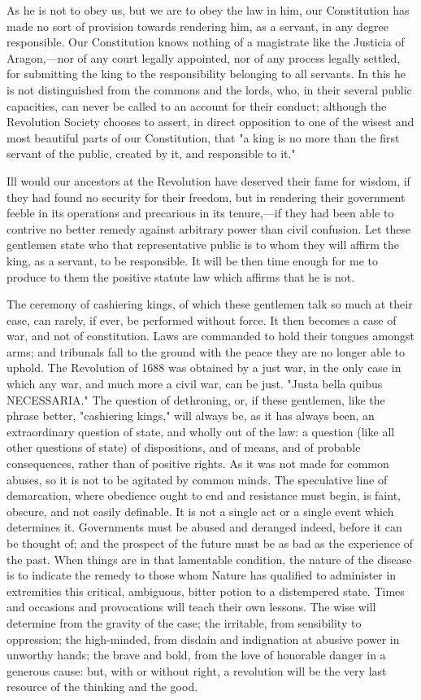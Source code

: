 As he is not to obey us, but we are to obey the law in him, our Constitution has made no sort of provision towards rendering him, as a servant, in any degree responsible. Our Constitution knows nothing of a magistrate like the Justicia of Aragon,—nor of any court legally appointed, nor of any process legally settled, for submitting the king to the responsibility belonging to all servants. In this he is not distinguished from the commons and the lords, who, in their several public capacities, can never be called to an account for their conduct; although the Revolution Society chooses to assert, in direct opposition to one of the wisest and most beautiful parts of our Constitution, that "a king is no more than the first servant of the public, created by it, and responsible to it."

Ill would our ancestors at the Revolution have deserved their fame for wisdom, if they had found no security for their freedom, but in rendering their government feeble in its operations and precarious in its tenure,—if they had been able to contrive no better remedy against arbitrary power than civil confusion. Let these gentlemen state who that representative public is to whom they will affirm the king, as a servant, to be responsible. It will be then time enough for me to produce to them the positive statute law which affirms that he is not.

The ceremony of cashiering kings, of which these gentlemen talk so much at their ease, can rarely, if ever, be performed without force. It then becomes a case of war, and not of constitution. Laws are commanded to hold their tongues amongst arms; and tribunals fall to the ground with the peace they are no longer able to uphold. The Revolution of 1688 was obtained by a just war, in the only case in which any war, and much more a civil war, can be just. "Justa bella quibus NECESSARIA." The question of dethroning, or, if these gentlemen, like the phrase better, "cashiering kings," will always be, as it has always been, an extraordinary question of state, and wholly out of the law: a question (like all other questions of state) of dispositions, and of means, and of probable consequences, rather than of positive rights. As it was not made for common abuses, so it is not to be agitated by common minds. The speculative line of demarcation, where obedience ought to end and resistance must begin, is faint, obscure, and not easily definable. It is not a single act or a single event which determines it. Governments must be abused and deranged indeed, before it can be thought of; and the prospect of the future must be as bad as the experience of the past. When things are in that lamentable condition, the nature of the disease is to indicate the remedy to those whom Nature has qualified to administer in extremities this critical, ambiguous, bitter potion to a distempered state. Times and occasions and provocations will teach their own lessons. The wise will determine from the gravity of the case; the irritable, from sensibility to oppression; the high-minded, from disdain and indignation at abusive power in unworthy hands; the brave and bold, from the love of honorable danger in a generous cause: but, with or without right, a revolution will be the very last resource of the thinking and the good.

